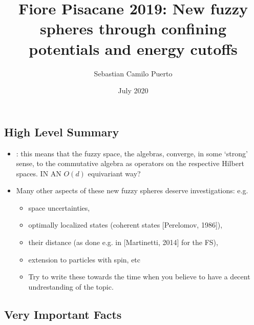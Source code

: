\documentclass{article}
\title{Fiore Pisacane 2019: New fuzzy spheres through confining potentials and energy cutoffs}
\author{Sebastian Camilo Puerto}
\date{July 2020}
\begin{document}
\maketitle

\tableofcontents

\subsection{High Level Summary}

    \begin{itemize}

    \item {}: this means that the fuzzy space, the algebras, converge, in some `strong' sense, to the commutative algebra as operators on the respective Hilbert spaces. IN AN $O(d)$ equivariant way?
    
    \item Many other aspects of these new fuzzy spheres deserve investigations: e.g.
    
        \begin{itemize}
            
        \item space uncertainties,
        
        \item optimally localized states (coherent states [Perelomov, 1986]),
        
        \item their distance (as done e.g. in [Martinetti, 2014] for the FS),
        
        \item extension to particles with spin, etc
        
        \item Try to write these towards the time when you believe to have a decent undrestanding of the topic.
        
        \end{itemize}
    
    \end{itemize}

\subsection{Very Important Facts}
\end{document}
